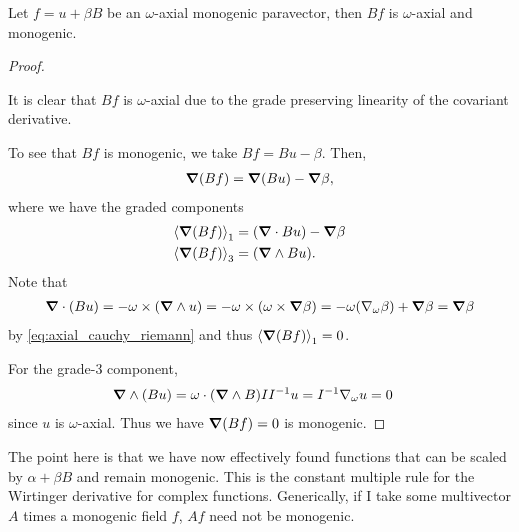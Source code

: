 \documentclass[12pt]{article}
\begin{document}
\begin{lemma}
    \label{lem:mult_by_i_monogenic}
    Let $f=u+\beta B$ be an $\omega$-axial monogenic paravector, then $B f$ is $\omega$-axial and monogenic.
\end{lemma}
\begin{proof}~
    
    It is clear that $B f$ is $\omega$-axial due to the grade preserving linearity of the covariant derivative.
    
    To see that $B f$ is monogenic, we take $B  f = B  u - \beta$.  Then,
    \begin{align*}
    \grad (Bf) = \grad (B u) - \grad \beta,
    \end{align*}
    where we have the graded components
    \begin{align*}
        \proj{1}{\grad (B f)} &= (\grad \cdot Bu)  - \grad \beta\\
        \proj{3}{\grad (Bf)} &= (\grad \wedge B u).
    \end{align*}
    Note that
    \begin{align*}
    \grad \cdot (Bu) =  -\omega \times (\grad \wedge u)  =- \omega \times (\omega \times \grad\beta) = -\omega (\nabla_\omega \beta)+\grad \beta = \grad \beta
    \end{align*}
    by \ref{eq:axial_cauchy_riemann} and thus $\proj{1}{\grad (Bf)}=0$. 
    
    For the grade-3 component,
    \begin{align*}
        \grad \wedge (B u) &= \omega \cdot  (\grad \wedge B)II^{-1}u = I^{-1} \nabla_\omega u=0
    \end{align*}
    since $u$ is $\omega$-axial. Thus we have $\grad(B f)=0$ is monogenic.
\end{proof}

The point here is that we have now effectively found functions that can be scaled by $\alpha + \beta B$ and remain monogenic.  This is the constant multiple rule for the Wirtinger derivative for complex functions. Generically, if I take some multivector $A$ times a monogenic field $f$, $Af$ need not be monogenic.
\end{document}
